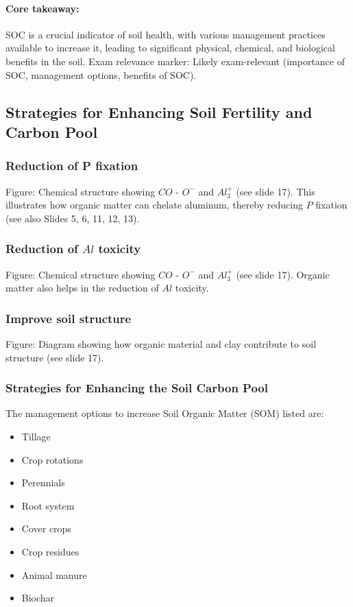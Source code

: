 \paragraph*{Core takeaway:} 
SOC is a crucial indicator of soil health, with various management practices available to increase it, leading to significant physical, chemical, and biological benefits in the soil. Exam relevance marker: Likely exam-relevant (importance of SOC, management options, benefits of SOC).

\subsection{Strategies for Enhancing Soil Fertility and Carbon Pool} 
\subsubsection*{Reduction of P fixation} 
Figure: Chemical structure showing $CO$ - $O^-$ and $Al_3^+$ (see slide 17). This illustrates how organic matter can chelate aluminum, thereby reducing $P$ fixation (see also Slides 5, 6, 11, 12, 13).

\subsubsection*{Reduction of $Al$ toxicity} 
Figure: Chemical structure showing $CO$ - $O^-$ and $Al_3^+$ (see slide 17). Organic matter also helps in the reduction of $Al$ toxicity.

\subsubsection*{Improve soil structure} 
Figure: Diagram showing how organic material and clay contribute to soil structure (see slide 17).

\subsubsection*{Strategies for Enhancing the Soil Carbon Pool} 
The management options to increase Soil Organic Matter (SOM) listed are: 

\begin{itemize} 
    \item Tillage 
    \item Crop rotations 
    \item Perennials 
    \item Root system 
    \item Cover crops 
    \item Crop residues 
    \item Animal manure 
    \item Biochar 
\end{itemize}


